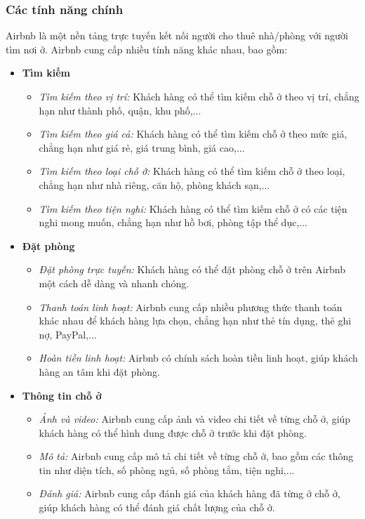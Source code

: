 \subsubsection{Các tính năng chính}
Airbnb là một nền tảng trực tuyến kết nối người cho thuê nhà/phòng với người tìm nơi ở. Airbnb cung cấp nhiều tính năng khác nhau, bao gồm:
\begin{itemize}
    \item \textbf{Tìm kiếm}
    \begin{itemize}
        \item \textit{Tìm kiếm theo vị trí:} Khách hàng có thể tìm kiếm chỗ ở theo vị trí, chẳng hạn như thành phố, quận, khu phố,...
        \item \textit{Tìm kiếm theo giá cả:} Khách hàng có thể tìm kiếm chỗ ở theo mức giá, chẳng hạn như giá rẻ, giá trung bình, giá cao,...
        \item \textit{Tìm kiếm theo loại chỗ ở:} Khách hàng có thể tìm kiếm chỗ ở theo loại, chẳng hạn như nhà riêng, căn hộ, phòng khách sạn,...
        \item \textit{Tìm kiếm theo tiện nghi:} Khách hàng có thể tìm kiếm chỗ ở có các tiện nghi mong muốn, chẳng hạn như hồ bơi, phòng tập thể dục,...
    \end{itemize}
    \item \textbf{Đặt phòng}
    \begin{itemize}
        \item \textit{Đặt phòng trực tuyến:} Khách hàng có thể đặt phòng chỗ ở trên Airbnb một cách dễ dàng và nhanh chóng.
        \item \textit{Thanh toán linh hoạt:} Airbnb cung cấp nhiều phương thức thanh toán khác nhau để khách hàng lựa chọn, chẳng hạn như thẻ tín dụng, thẻ ghi nợ, PayPal,...
        \item \textit{Hoàn tiền linh hoạt:} Airbnb có chính sách hoàn tiền linh hoạt, giúp khách hàng an tâm khi đặt phòng.
    \end{itemize}
    \item \textbf{Thông tin chỗ ở}
    \begin{itemize}
        \item \textit{Ảnh và video:} Airbnb cung cấp ảnh và video chi tiết về từng chỗ ở, giúp khách hàng có thể hình dung được chỗ ở trước khi đặt phòng.
        \item \textit{Mô tả:} Airbnb cung cấp mô tả chi tiết về từng chỗ ở, bao gồm các thông tin như diện tích, số phòng ngủ, số phòng tắm, tiện nghi,...
        \item \textit{Đánh giá:} Airbnb cung cấp đánh giá của khách hàng đã từng ở chỗ ở, giúp khách hàng có thể đánh giá chất lượng của chỗ ở.

\end{itemize}
\end{itemize}

